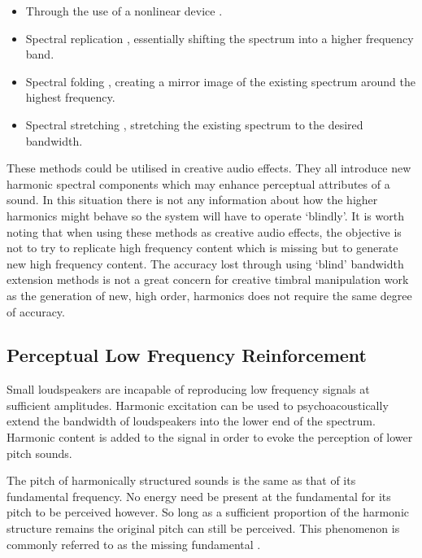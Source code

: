 		\begin{itemize}
			\item Through the use of a nonlinear device \citep{larsen2002efficient, sha2010high}.
			\item Spectral replication \citep{nagel2010a}, essentially shifting the spectrum into a higher
			      frequency band.
			\item Spectral folding \citep{friedrich2007spectral}, creating a mirror image of the existing
			      spectrum around the highest frequency.
			\item Spectral stretching \citep{nagel2009a}, stretching the existing spectrum to the desired
			      bandwidth.
		\end{itemize}

		These methods could be utilised in creative audio effects. They all introduce new harmonic spectral
		components which may enhance perceptual attributes of a sound. In this situation there is not any
		information about how the higher harmonics might behave so the system will have to operate `blindly'. It is
		worth noting that when using these methods as creative audio effects, the objective is not to try to
		replicate high frequency content which is missing but to generate new high frequency content. The accuracy
		lost through using `blind' bandwidth extension methods is not a great concern for creative timbral
		manipulation work as the generation of new, high order, harmonics does not require the same degree of
		accuracy.

	\subsection{Perceptual Low Frequency Reinforcement}
	\label{sec:Excitation-Uses-Reinforcement}
		Small loudspeakers are incapable of reproducing low frequency signals at sufficient amplitudes. Harmonic
		excitation can be used to psychoacoustically extend the bandwidth of loudspeakers into the lower end of the
		spectrum. Harmonic content is added to the signal in order to evoke the perception of lower pitch sounds.

		The pitch of harmonically structured sounds is the same as that of its fundamental frequency. No energy
		need be present at the fundamental for its pitch to be perceived however. So long as a sufficient
		proportion of the harmonic structure remains the original pitch can still be perceived. This phenomenon is
		commonly referred to as the missing fundamental \citep{plack2005the}.

